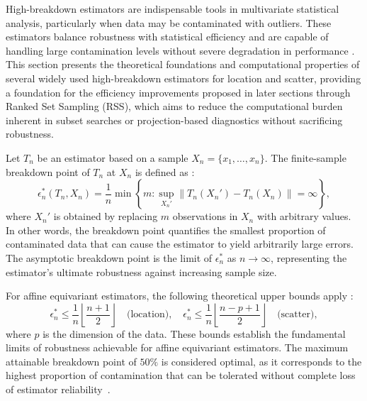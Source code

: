 \documentclass[12pt]{article}
\begin{document}
High-breakdown estimators are indispensable tools in multivariate statistical analysis, particularly when data may be contaminated with outliers. These estimators balance robustness with statistical efficiency and are capable of handling large contamination levels without severe degradation in performance \cite{zhang2023fast}.
This section presents the theoretical foundations and computational properties of several widely used high-breakdown estimators for location and scatter, providing a foundation for the efficiency improvements proposed in later sections through Ranked Set Sampling (RSS), which aims to reduce the computational burden inherent in subset searches or projection-based diagnostics without sacrificing robustness.

Let $T_n$ be an estimator based on a sample $X_n = \{x_1, \ldots, x_n\}$. The finite-sample breakdown point of $T_n$
at $X_n$ is defined as \cite{rousseeuw1999fast}:
\[
\epsilon^*_n(T_n, X_n) = \frac{1}{n} \min \left\{ m : \sup_{X_n'} \| T_n(X_n') - T_n(X_n) \| = \infty \right\},
\]
where $X_n'$ is obtained by replacing $m$ observations in $X_n$ with arbitrary values. In other words, the breakdown point quantifies the smallest proportion of contaminated data that can cause the estimator to yield arbitrarily large errors. The asymptotic breakdown point is the limit of $\epsilon^*_n$ as $n \to \infty$, representing the estimator’s ultimate robustness against increasing sample size.

For affine equivariant estimators, the following theoretical upper bounds apply \cite{maronna2019robust}:
\[
\epsilon^*_n \leq \frac{1}{n} \left\lfloor \frac{n + 1}{2} \right\rfloor \quad \text{(location)}, \quad \epsilon^*_n \leq \frac{1}{n} \left\lfloor \frac{n - p + 1}{2} \right\rfloor \quad \text{(scatter)},
\]
where $p$ is the dimension of the data. These bounds establish the fundamental limits of robustness achievable for affine equivariant estimators. The maximum attainable breakdown point of $50\%$ is considered optimal, as it corresponds to the highest proportion of contamination that can be tolerated without complete loss of estimator reliability~\cite{maronna2019robust}.
\end{document}
